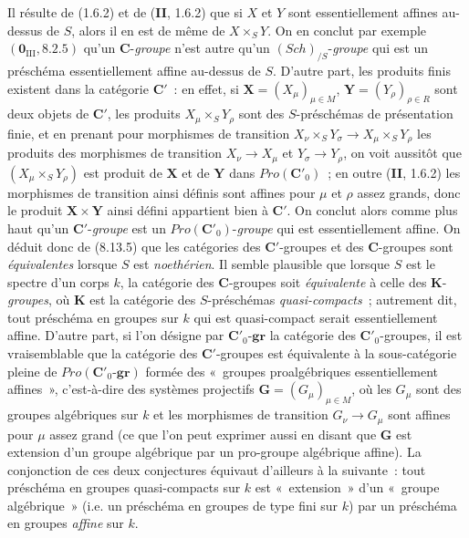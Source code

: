 \begin{remark}[8.13.6]
\label{IV.8.13.6-fr}
Il résulte de (1.6.2) et de (\textbf{II}, 1.6.2) que si $X$ et $Y$ sont
essentiellement affines au-dessus de $S$, alors il en est de même de
$X\times_S Y$. On en conclut par exemple $(\mathbf 0_{\mathrm{III}},8.2.5)$
qu'un $\boldsymbol{C}$-\emph{groupe} n'est autre qu'un $(\boldsymbol{\mathit{Sch}})_{/S}$-\emph{groupe} qui
est un préschéma essentiellement affine au-dessus de $S$. D'autre part, les
produits finis existent dans la catégorie $\boldsymbol{C}'$~: en effet, si
$\mathbf X=(X_\mu)_{\mu\in M}$, $\mathbf Y=(Y_\rho)_{\rho\in R}$ sont deux
objets de $\boldsymbol{C}'$, les produits $X_\mu\times_S Y_\rho$ sont des
$S$-préschémas de présentation finie, et en prenant pour morphismes de
transition
$X_\nu\times_S Y_\sigma\longrightarrow X_\mu\times_S Y_\rho$
les produits des morphismes de transition $X_\nu\to X_\mu$ et
$Y_\sigma\to Y_\rho$, on voit aussitôt que
$(X_\mu\times_S Y_\rho)$ est produit de $\mathbf X$ et de $\mathbf Y$ dans
$\boldsymbol{\mathit{Pro}}(\boldsymbol{C}'_0)$~; en outre (\textbf{II}, 1.6.2) les morphismes de
transition ainsi définis sont affines pour $\mu$ et $\rho$ assez grands, donc
le produit $\mathbf X\times\mathbf Y$ ainsi défini appartient bien à
$\boldsymbol{C}'$. On conclut alors comme plus haut qu'un $\boldsymbol{C}'$-\emph{groupe} est
un $\boldsymbol{\mathit{Pro}}(\boldsymbol{C}'_0)$-\emph{groupe} qui est essentiellement affine. On
déduit donc de (8.13.5) que les catégories des $\boldsymbol{C}'$-groupes et des
$\boldsymbol{C}$-groupes sont \emph{équivalentes} lorsque $S$ est
\emph{noethérien}. Il semble plausible que lorsque $S$ est le spectre d'un
corps $k$, la catégorie des $\boldsymbol{C}$-groupes soit \emph{équivalente} à
celle des $\boldsymbol K$-\emph{groupes}, où $\boldsymbol K$ est la catégorie des
$S$-préschémas \emph{quasi-compacts}~; autrement dit, tout préschéma en
groupes sur $k$ qui est quasi-compact serait essentiellement affine. D'autre
part, si l'on désigne
par $\boldsymbol{C}'_0$-$\boldsymbol{gr}$ la catégorie des
$\boldsymbol{C}'_0$-groupes, il est vraisemblable que la catégorie des
$\boldsymbol{C}'$-groupes est équivalente à la sous-catégorie pleine de
$\boldsymbol{\mathit{Pro}}(\boldsymbol{C}'_0\text{-}\boldsymbol{gr})$ formée des «~groupes
proalgébriques essentiellement affines~», c'est-à-dire des systèmes
projectifs $\mathbf G=(G_\mu)_{\mu\in M}$, où les $G_\mu$ sont des groupes
algébriques sur $k$ et les morphismes de transition $G_\nu\to G_\mu$ sont
affines pour $\mu$ assez grand (ce que l'on peut exprimer aussi en disant que
$\mathbf G$ est extension d'un groupe algébrique par un pro-groupe algébrique
affine). La conjonction de ces deux conjectures équivaut d'ailleurs à la
suivante~: tout préschéma en groupes quasi-compacts sur $k$ est «~extension~»
d'un «~groupe algébrique~» (i.e. un préschéma en groupes de type fini sur $k$)
par un préschéma en groupes \emph{affine} sur $k$.


\end{remark}
